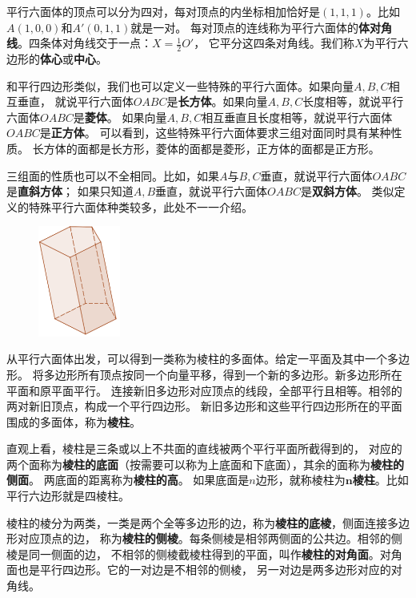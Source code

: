 \documentclass[12pt,UTF8]{ctexbook}
\begin{document}
平行六面体的顶点可以分为四对，每对顶点的内坐标相加恰好是$(1,1,1)$。比如$A(1,0,0)$和$A'(0,1,1)$就是一对。
每对顶点的连线称为平行六面体的\textbf{体对角线}。四条体对角线交于一点：$X=\frac{1}{2}O'$，
它平分这四条对角线。我们称$X$为平行六边形的\textbf{体心}或\textbf{中心}。

和平行四边形类似，我们也可以定义一些特殊的平行六面体。如果向量$A,B,C$相互垂直，
就说平行六面体$OABC$是\textbf{长方体}。如果向量$A,B,C$长度相等，就说平行六面体$OABC$是\textbf{菱体}。
如果向量$A,B,C$相互垂直且长度相等，就说平行六面体$OABC$是\textbf{正方体}。
可以看到，这些特殊平行六面体要求三组对面同时具有某种性质。
长方体的面都是长方形，菱体的面都是菱形，正方体的面都是正方形。

三组面的性质也可以不全相同。比如，如果$A$与$B,C$垂直，就说平行六面体$OABC$是\textbf{直斜方体}；
如果只知道$A,B$垂直，就说平行六面体$OABC$是\textbf{双斜方体}。
类似定义的特殊平行六面体种类较多，此处不一一介绍。


\begin{figure} %
    \vspace{-40pt}
    \flushright
    \includegraphics[width=0.24\textwidth]{tu/棱柱1.png}
\end{figure}

从平行六面体出发，可以得到一类称为棱柱的多面体。给定一平面及其中一个多边形。
将多边形所有顶点按同一个向量平移，得到一个新的多边形。新多边形所在平面和原平面平行。
连接新旧多边形对应顶点的线段，全部平行且相等。相邻的两对新旧顶点，构成一个平行四边形。
新旧多边形和这些平行四边形所在的平面围成的多面体，称为\textbf{棱柱}。

直观上看，棱柱是三条或以上不共面的直线被两个平行平面所截得到的，
对应的两个面称为\textbf{棱柱的底面}（按需要可以称为上底面和下底面），其余的面称为\textbf{棱柱的侧面}。
两底面的距离称为\textbf{棱柱的高}。
如果底面是$n$边形，就称棱柱为$\mathbf{n}$\textbf{棱柱}。比如平行六边形就是四棱柱。

棱柱的棱分为两类，一类是两个全等多边形的边，称为\textbf{棱柱的底棱}，侧面连接多边形对应顶点的边，
称为\textbf{棱柱的侧棱}。每条侧棱是相邻两侧面的公共边。相邻的侧棱是同一侧面的边，
不相邻的侧棱截棱柱得到的平面，叫作\textbf{棱柱的对角面}。对角面也是平行四边形。它的一对边是不相邻的侧棱，
另一对边是两多边形对应的对角线。
\end{document}
